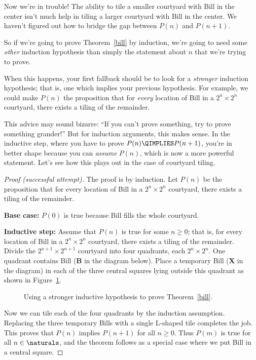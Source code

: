 Now we're in trouble!  The ability to tile a smaller courtyard with Bill
in the center isn't much help in tiling a larger courtyard with Bill in
the center.  We haven't figured out how to bridge the gap between $P(n)$
and $P(n+1)$.

So if we're going to prove Theorem~\ref{bill} by induction, we're going to
need some \emph{other} induction hypothesis than simply the statement
about $n$ that we're trying to prove.





When this happens, your first fallback should be to look for a
\emph{stronger} induction hypothesis; that is, one which implies
your previous hypothesis.  For example, we could make $P(n)$ the
proposition that for \emph{every} location of Bill in a $2^n \times
2^n$ courtyard, there exists a tiling of the remainder.

This advice may sound bizarre: ``If you can't prove something, try to
prove something grander!''  But for induction arguments, this makes sense.
In the inductive step, where you have to prove $P(n) \QIMPLIES P(n+1)$,
you're in better shape because you can \emph{assume} $P(n)$, which is now a
more powerful statement.  Let's see how this plays out in the case of
courtyard tiling.

\begin{proof}[Proof (successful attempt)]
The proof is by induction.  Let $P(n)$ be
the proposition that for every location of Bill in a $2^n \times 2^n$
courtyard, there exists a tiling of the remainder.

\textbf{Base case:} $P(0)$ is true because Bill fills the
whole courtyard.

\textbf{Inductive step:} Assume that $P(n)$ is true for some
$n \geq 0$; that is, for every location of Bill in a $2^n \times 2^n$
courtyard, there exists a tiling of the remainder.  Divide the
$2^{n+1} \times 2^{n+1}$ courtyard into four quadrants, each $2^n
\times 2^n$.  One quadrant contains Bill (\textbf{B} in the diagram
below).  Place a temporary Bill (\textbf{X} in the diagram) in each of
the three central squares lying outside this quadrant as shown in
Figure~\ref{fig:bill-strong-induction}.

\begin{figure}


\caption{Using a stronger inductive hypothesis to prove
  Theorem~\ref{bill}.}
\label{fig:bill-strong-induction}
\end{figure}

Now we can tile each of the four quadrants by the induction
assumption.  Replacing the three temporary Bills with a single
L-shaped tile completes the job.  This proves that $P(n)$ implies
$P(n+1)$ for all $n \geq 0$.  Thus $P(m)$ is true for all $n \in
\naturals$, and the theorem follows as a special case where we put
Bill in a central square.
\end{proof}

